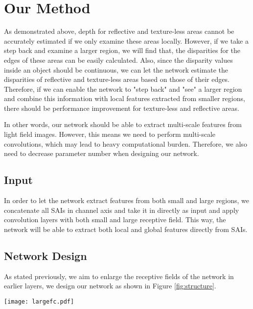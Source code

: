 \documentclass[10pt,twocolumn,letterpaper]{article}
\begin{document}
\section{Our Method}

As demonstrated above, depth for reflective and texture-less areas cannot be accurately estimated if we only examine these areas locally. However, if we take a step back and examine a larger region, we will find that, the disparities for the edges of these areas can be easily calculated. Also, since the disparity values inside an object should be continuous, we can let the network estimate the disparities of reflective and texture-less areas based on those of their edges. Therefore, if we can enable the network to "step back" and "see" a larger region and combine this information with local features extracted from smaller regions, there should be performance improvement for texture-less and reflective areas.

In other words, our network should be able to extract multi-scale features from light field images. However, this means we need to perform multi-scale convolutions, which may lead to heavy computational burden. Therefore, we also need to decrease parameter number when designing our network.

\subsection{Input}

In order to let the network extract features from both small and large regions, we concatenate all SAIs in channel axis and take it in directly as input and apply convolution layers with both small and large receptive field. This way, the network will be able to extract both local and global features directly from SAIs.


\subsection{Network Design}

As stated previously, we aim to enlarge the receptive fields of the network in earlier layers, we design our network as shown in Figure \ref{fig:structure}.

\begin{figure*}
	\begin{center}
		\texttt{[image: largefc.pdf]}
	\end{center}
	\caption{The structure of our network.}
	\label{fig:structure}
\end{figure*}
\end{document}
